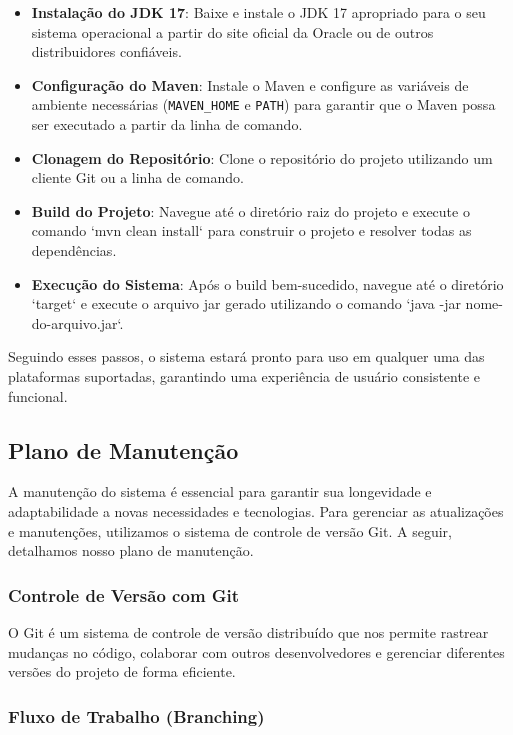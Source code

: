 \documentclass[../main.tex]{subfiles}
\begin{document}
\begin{itemize}
    \item \textbf{Instalação do JDK 17}: Baixe e instale o JDK 17 apropriado para o seu sistema operacional a partir do site oficial da Oracle ou de outros distribuidores confiáveis.
    \item \textbf{Configuração do Maven}: Instale o Maven e configure as variáveis de ambiente necessárias (\texttt{MAVEN\_HOME} e \texttt{PATH}) para garantir que o Maven possa ser executado a partir da linha de comando.
    \item \textbf{Clonagem do Repositório}: Clone o repositório do projeto utilizando um cliente Git ou a linha de comando.
    \item \textbf{Build do Projeto}: Navegue até o diretório raiz do projeto e execute o comando `mvn clean install` para construir o projeto e resolver todas as dependências.
    \item \textbf{Execução do Sistema}: Após o build bem-sucedido, navegue até o diretório `target` e execute o arquivo jar gerado utilizando o comando `java -jar nome-do-arquivo.jar`.
\end{itemize}

Seguindo esses passos, o sistema estará pronto para uso em qualquer uma das plataformas suportadas, garantindo uma experiência de usuário consistente e funcional.


\subsection{Plano de Manutenção}

A manutenção do sistema é essencial para garantir sua longevidade e adaptabilidade a novas necessidades e tecnologias. Para gerenciar as atualizações e manutenções, utilizamos o sistema de controle de versão Git. A seguir, detalhamos nosso plano de manutenção.

\subsubsection{Controle de Versão com Git}

O Git é um sistema de controle de versão distribuído que nos permite rastrear mudanças no código, colaborar com outros desenvolvedores e gerenciar diferentes versões do projeto de forma eficiente.

\subsubsection{Fluxo de Trabalho (Branching)}
\end{document}
